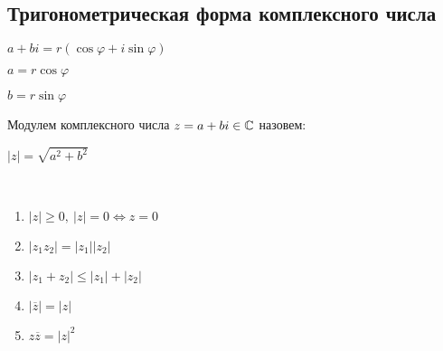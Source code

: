 \subsection{Тригонометрическая форма комплексного числа}

\begin{defn}
    
    $a + bi = r(\cos\varphi + i\sin\varphi)$
    
    $a = r\cos\varphi$
    
    $b = r\sin\varphi$
\end{defn}

\begin{defn}
    Модулем комплексного числа $z = a + bi \in \mathbb{C}$ назовем:
    
    $|z| = \sqrt{a^2 + b^2}$
\end{defn}

\begin{theorem-non}~
    \begin{enumerate}
        \item $|z| \geq 0,~|z| = 0 \iff z = 0$
        
        \item $|z_1 z_2| = |z_1||z_2|$
        
        \item $|z_1 + z_2| \leq |z_1| + |z_2|$
        
        \item $|\overline{z}| = |z|$
        
        \item $z \overline{z} = |z|^2$
    \end{enumerate}
\end{theorem-non}

